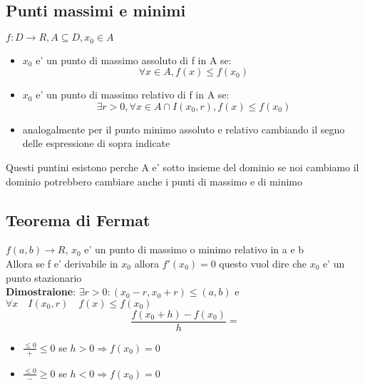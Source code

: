 \documentclass{article}
\begin{document}
        \subsection{Punti massimi e minimi}
        \begin{flushleft}
          $f: D \to R, A\subseteq D, x_0 \in A$
          \begin{itemize}
            \item $x_0$ e' un punto di massimo assoluto di f in A se:
              \begin{equation}
                \forall x \in A, f(x) \leq f(x_0) 
              \end{equation}
            \item $x_0$ e' un punto di massimo relativo di f in A se:
              \begin{equation}
                \exists r>0,\forall x \in A \cap I(x_0,r), f(x)\leq f(x_0)
              \end{equation}
            \item analogalmente per il punto minimo assoluto e relativo cambiando il segno delle espressione di sopra indicate
          \end{itemize}
          Questi puntini esistono perche A e' sotto insieme del dominio se noi cambiamo il dominio potrebbero cambiare anche i punti di massimo e 
          di minimo
        \end{flushleft}
        \subsection{Teorema di Fermat}
        \begin{flushleft}
          $f(a,b) \to R$, $x_0$ e' un punto di massimo o minimo relativo in a e b \\ 
          Allora se f e' derivabile in $x_0$ allora $f'(x_0)=0$ questo vuol dire che $x_0$ e' un punto stazionario \\
          \textbf{Dimostraione}: $\exists r>0:(x_0-r,x_0+r) \leq (a,b)$ e $\forall x \quad I(x_0,r) \quad f(x) \leq f(x_0)$
          \begin{equation}
            \frac{f(x_0+h) - f(x_0)}{h}= 
          \end{equation}
          \begin{itemize}
            \item $\frac{\leq 0}{+}\leq 0$ se $h>0 \Rightarrow f(x_0)=0$
            \item $\frac{\leq 0}{-}\geq 0$ se $h<0 \Rightarrow f(x_0)=0$
          \end{itemize}
        \end{flushleft}
\end{document}
